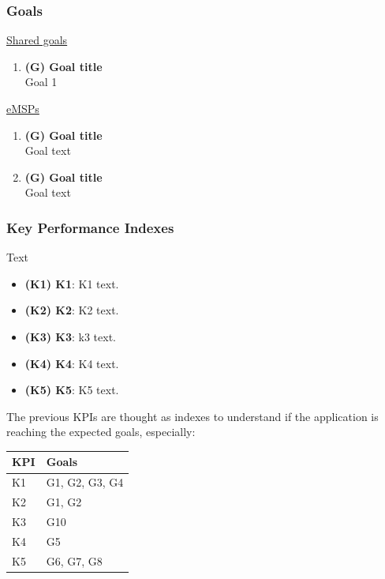 \documentclass[table, 12pt]{article} %
\begin{document}
    \subsubsection{Goals}
        \underline{Shared goals}
        \begin{enumerate}
            \item  \textbf{(G) Goal title} \\Goal 1 
        \end{enumerate}
        \underline{eMSPs}
        \begin{enumerate}
            \item \textbf{(G) Goal title}\\
            Goal text

            \item \textbf{(G) Goal title}\\
            Goal text
        \end{enumerate}
        
    
    \subsubsection{Key Performance Indexes}
        Text
        \begin{itemize}  
            \item \textbf{(K1) K1}: K1 text.
            \item \textbf{(K2) K2}: K2 text.
            \item \textbf{(K3) K3}: k3 text.
            \item \textbf{(K4) K4}: K4 text.
            \item \textbf{(K5) K5}: K5 text.
        \end{itemize}
        
        The previous KPIs are thought as indexes to understand if the application is reaching the expected goals, especially:
        
        \begin{table}[H]
            \centering
            \begin{tabular}{|l|l|}
                \hline
                \textbf{KPI} & \textbf{Goals}\\\hline
                K1 & G1, G2, G3, G4\\\hline
                K2 & G1, G2 \\\hline
                K3 & G10\\\hline   
                K4 & G5 \\\hline
                K5 & G6, G7, G8\\\hline
            \end{tabular}
        \end{table}
    
\end{document}
